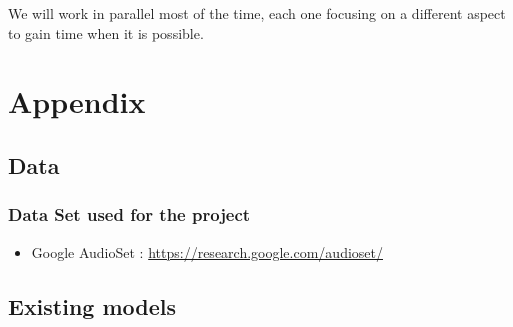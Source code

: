 \documentclass[11pt]{article}
\begin{document}
We will work in parallel most of the time, each one focusing on a different aspect to gain time when it is possible.

\pagebreak

\section{Appendix}

\subsection{Data}

\subsubsection*{Data Set used for the project}

\begin{itemize}
  \item Google AudioSet : \url{https://research.google.com/audioset/}
        \label{item:google-audioset}
\end{itemize}

\subsection{Existing models}
\end{document}
